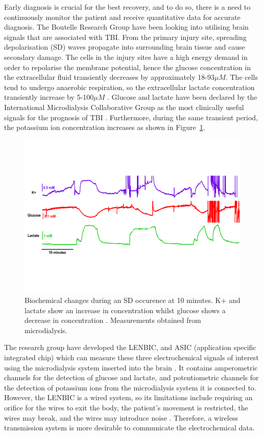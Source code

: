 Early diagnosis is crucial for the best recovery, and to do so, there is a need to continuously monitor the patient and receive quantitative data for accurate diagnosis. The Boutelle Research Group have been looking into utilising brain signals that are associated with TBI. From the primary injury site, spreading depolarisation (SD) waves propagate into surrounding brain tissue and cause secondary damage. The cells in the injury sites have a high energy demand in order to repolarise the membrane potential, hence the glucose concentration in the extracellular fluid transiently decreases by approximately 18-93$\mu M$. The cells tend to undergo anaerobic respiration, so the extracellular lactate concentration transiently increase by 5-100$\mu M$ \cite{D.2010}. Glucose and lactate have been declared by the International Microdialysis Collaborative Group as the most clinically useful signals for the prognosis of TBI \cite{Hutchinson2015}. Furthermore, during the same transient period, the potassium ion concentration increases \cite{Rogers:2011:10.1039/c0cp02810j} as shown in Figure~\ref{fig: SD}.

\begin{figure}[t]
\centering
\includegraphics[trim={0cm 5cm 0.5cm  5cm}, clip, width=1\textwidth]{./figures/conc.pdf}
\captionsetup{justification=centering}
\caption{Biochemical changes during an SD occurence at 10 minutes. K+ and lactate show an increase in concentration whilst glucose shows a decrease in concentration \cite{Rogers2017}. Measurements obtained from microdialysis.}
\label{fig: SD}
\end{figure}

The research group have developed the LENBIC, and ASIC (application specific integrated chip) which can measure these three electrochemical signals of interest using the microdialysis system inserted into the brain \cite{Pagkalos2017}. It contains amperometric channels for the detection of glucose and lactate, and potentiometric channels for the detection of potassium ions from the microdialysis system it is connected to. However, the LENBIC is a wired system, so its limitations include requiring an orifice for the wires to exit the body, the patient's movement is restricted, the wires may break, and the wires may introduce noise \cite{Ferguson2011}. Therefore, a wireless transmission system is more desirable to communicate the electrochemical data. 

